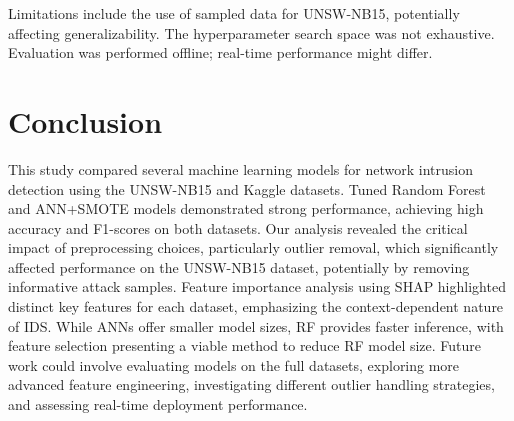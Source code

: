 \documentclass[sigconf,screen,final,nonacm]{acmart}
\begin{document}
Limitations include the use of sampled data for UNSW-NB15, potentially affecting generalizability. The hyperparameter search space was not exhaustive. Evaluation was performed offline; real-time performance might differ.

\section{Conclusion}
This study compared several machine learning models for network intrusion detection using the UNSW-NB15 and Kaggle datasets. Tuned Random Forest and ANN+SMOTE models demonstrated strong performance, achieving high accuracy and F1-scores on both datasets. Our analysis revealed the critical impact of preprocessing choices, particularly outlier removal, which significantly affected performance on the UNSW-NB15 dataset, potentially by removing informative attack samples. Feature importance analysis using SHAP highlighted distinct key features for each dataset, emphasizing the context-dependent nature of IDS. While ANNs offer smaller model sizes, RF provides faster inference, with feature selection presenting a viable method to reduce RF model size. Future work could involve evaluating models on the full datasets, exploring more advanced feature engineering, investigating different outlier handling strategies, and assessing real-time deployment performance.


\end{document}

